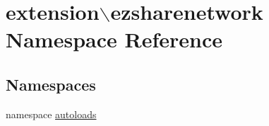 \hypertarget{namespaceextension_1_1ezsharenetwork}{\section{extension$\backslash$ezsharenetwork Namespace Reference}
\label{namespaceextension_1_1ezsharenetwork}
}
\subsection*{Namespaces}
\begin{DoxyCompactItemize}
\item 
namespace \hyperlink{namespaceextension_1_1ezsharenetwork_1_1autoloads}{autoloads}
\end{DoxyCompactItemize}
